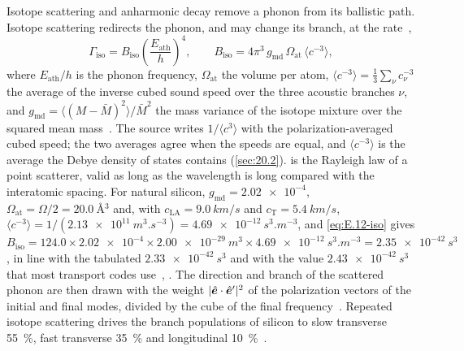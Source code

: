 Isotope scattering and anharmonic decay remove a phonon from its ballistic path. Isotope scattering redirects the phonon, and may change its branch, at the rate~\cite{tamura1983isotope}, \cite[Eq.~(6)]{leman2012invited}
\begin{equation}
  \varGamma_{\mathrm{iso}} = B_{\mathrm{iso}}\left(\frac{E_{\mathrm{ath}}}{h}\right)^4 , \qquad
  B_{\mathrm{iso}} = 4\pi^3\,g_{\mathrm{md}}\,\Omega_{\mathrm{at}}\,\langle c^{-3}\rangle,
  \label{eq:E.12-iso}
\end{equation}
where $E_{\mathrm{ath}}/h$ is the phonon frequency, $\Omega_{\mathrm{at}}$ the volume per atom, $\langle c^{-3}\rangle = \tfrac13\sum_\nu c_\nu^{-3}$ the average of the inverse cubed sound speed over the three acoustic branches $\nu$, and $g_{\mathrm{md}} = \langle (M - \bar M)^2\rangle/\bar M^2$ the mass variance of the isotope mixture over the squared mean mass~\cite[Eqs.~(3)--(5)]{hernandez2025modeling}. The source writes $1/\langle c^3\rangle$ with the polarization-averaged cubed speed; the two averages agree when the speeds are equal, and $\langle c^{-3}\rangle$ is the average the Debye density of states contains (\cref{sec:20.2}).  is the Rayleigh law of a point scatterer, valid as long as the wavelength is long compared with the interatomic spacing. For natural silicon, $g_{\mathrm{md}} = \num{2.02e-4}$, $\Omega_{\mathrm{at}} = \Omega/2 = \SI{20.0}{\angstrom^3}$ and, with $c_{\mathrm{LA}} = \SI{9.0}{km/s}$ and $c_{\mathrm{T}} = \SI{5.4}{km/s}$, $\langle c^{-3}\rangle = 1/(\SI{2.13e11}{m^3.s^{-3}}) = \SI{4.69e-12}{s^3.m^{-3}}$, and \cref{eq:E.12-iso} gives $B_{\mathrm{iso}} = 124.0\times\num{2.02e-4}\times\SI{2.00e-29}{m^3}\times\SI{4.69e-12}{s^3.m^{-3}} = \SI{2.35e-42}{s^3}$, in line with the tabulated $\SI{2.33e-42}{s^3}$ and with the value $\SI{2.43e-42}{s^3}$ that most transport codes use~\cite[Table~4]{hernandez2025modeling}, \cite[Table~I]{leman2012invited}. The direction and branch of the scattered phonon are then drawn with the weight $|\hat{\bm{e}}\cdot\hat{\bm{e}}'|^2$ of the polarization vectors of the initial and final modes, divided by the cube of the final frequency~\cite[Eq.~(7)]{leman2012invited}. Repeated isotope scattering drives the branch populations of silicon to slow transverse \SI{55}{\percent}, fast transverse \SI{35}{\percent} and longitudinal \SI{10}{\percent}~\cite[Sect.~III\,E]{leman2012invited}.


